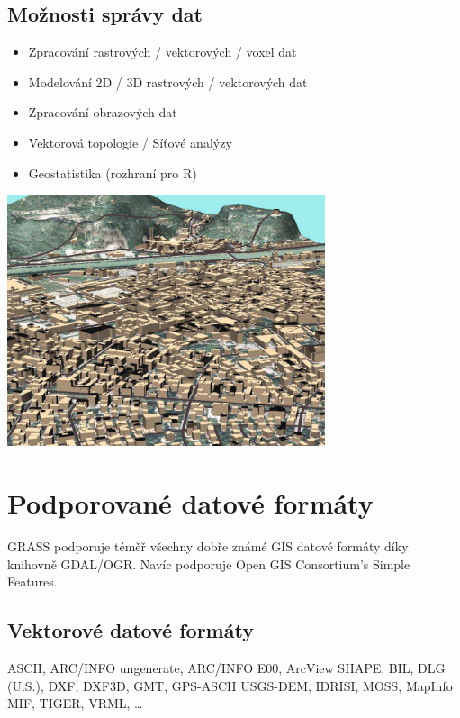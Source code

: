 \documentclass[notumble,a4paper,10pt,nofoldmark]{leaflet}
\newenvironment{myfig}[1][0pt plus 1.5ex minus
.5ex]{\par\vspace*{#1}\begin{minipage}{\textwidth}\centering}{\end{minipage}}
\begin{document}
\subsection{Možnosti správy dat}

\begin{itemize}
\item Zpracování rastrových / vektorových / voxel dat
\item Modelování 2D / 3D rastrových / vektorových dat
\item Zpracování obrazových dat
\item Vektorová topologie / Síťové analýzy
\item Geostatistika (rozhraní pro R)
\end{itemize}

\begin{myfig}[1ex]
\includegraphics[width=0.7\textwidth]{trento3d}
\end{myfig}

\section{Podporované datové formáty}

GRASS podporuje téměř všechny dobře známé GIS datové formáty díky
knihovně GDAL/OGR. Navíc podporuje Open GIS Consortium's Simple
Features.

\subsection{Vektorové datové formáty}
ASCII, ARC/INFO ungenerate, ARC/INFO E00, Arc\-View SHAPE, BIL, DLG
(U.S.), DXF, DXF3D, GMT, GPS-ASCII USGS-DEM, IDRISI, MOSS, MapInfo
MIF, TIGER, VRML, \dots
\end{document}
